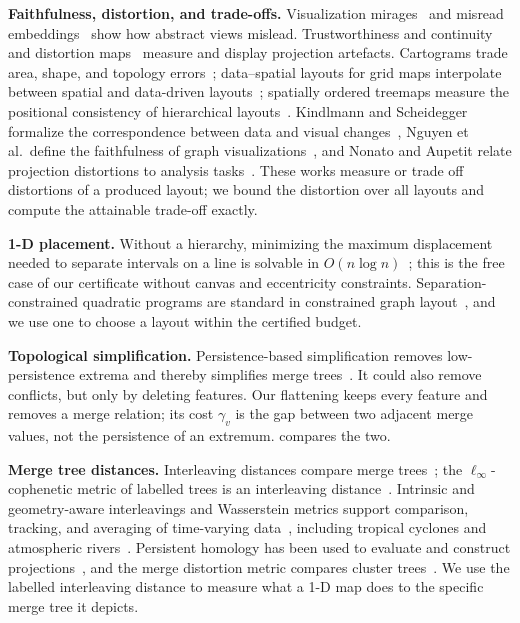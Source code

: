 \documentclass[review]{vgtc}                 %
\begin{document}
\textbf{Faithfulness, distortion, and trade-offs.}
Visualization mirages~\cite{McNutt:2020:SVM} and misread embeddings~\cite{Wattenberg:2016:TSNE} show how abstract views mislead. Trustworthiness and continuity~\cite{Venna:2001:NP} and distortion maps~\cite{Aupetit:2007:VD,Rauscher:2025:1DO,Rauscher:2026:VB} measure and display projection artefacts. Cartograms trade area, shape, and topology errors~\cite{Nusrat:2016:CART}; data--spatial layouts for grid maps interpolate between spatial and data-driven layouts~\cite{vanBeusekom:2023:DSL}; spatially ordered treemaps measure the positional consistency of hierarchical layouts~\cite{Wood:2008:SOT}. Kindlmann and Scheidegger formalize the correspondence between data and visual changes~\cite{Kindlmann:2014:AVD}, Nguyen et al.\ define the faithfulness of graph visualizations~\cite{Nguyen:2013:FGV}, and Nonato and Aupetit relate projection distortions to analysis tasks~\cite{Nonato:2019:MP}. These works measure or trade off distortions of a produced layout; we bound the distortion over all layouts and compute the attainable trade-off exactly.

\textbf{1-D placement.}
Without a hierarchy, minimizing the maximum displacement needed to separate intervals on a line is solvable in $O(n\log n)$~\cite{Li:2019:SOI}; this is the free case of our certificate without canvas and eccentricity constraints. Separation-constrained quadratic programs are standard in constrained graph layout~\cite{Dwyer:2006:IPSEP}, and we use one to choose a layout within the certified budget.

\textbf{Topological simplification.}
Persistence-based simplification removes low-persistence extrema and thereby simplifies merge trees~\cite{Edelsbrunner:2002:TPS,Carr:2004:SFI,Tierny:2012:GTS}. It could also remove conflicts, but only by deleting features. Our flattening keeps every feature and removes a merge relation; its cost $\gamma_v$ is the gap between two adjacent merge values, not the persistence of an extremum.  compares the two.

\textbf{Merge tree distances.}
Interleaving distances compare merge trees~\cite{Morozov:2013:IDMT}; the $\ell_\infty$-cophenetic metric of labelled trees is an interleaving distance~\cite{Munch:2019:LINF}. Intrinsic and geometry-aware interleavings and Wasserstein metrics support comparison, tracking, and averaging of time-varying data~\cite{Gasparovic:2024:IID,Yan:2022:GAMT,Pont:2022:WMT}, including tropical cyclones and atmospheric rivers~\cite{Yan:2024:TROPHY,Lan:2024:AR}. Persistent homology has been used to evaluate and construct projections~\cite{Rieck:2015:PH,Doraiswamy:2021:TM}, and the merge distortion metric compares cluster trees~\cite{Eldridge:2015:MD}. We use the labelled interleaving distance to measure what a 1-D map does to the specific merge tree it depicts.
\end{document}
